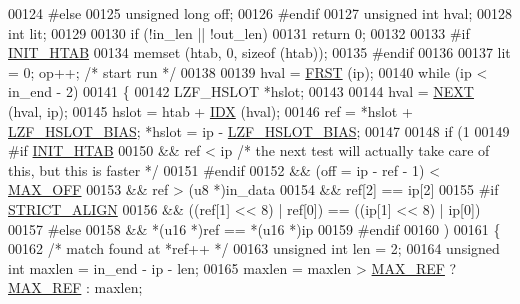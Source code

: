 \begin{DoxyCode}
00124 \textcolor{preprocessor}{#}\textcolor{preprocessor}{else}
00125   \textcolor{keywordtype}{unsigned} \textcolor{keywordtype}{long} off;
00126 \textcolor{preprocessor}{#}\textcolor{preprocessor}{endif}
00127   \textcolor{keywordtype}{unsigned} \textcolor{keywordtype}{int} hval;
00128   \textcolor{keywordtype}{int} lit;
00129 
00130   \textcolor{keywordflow}{if} (!in\_len || !out\_len)
00131     \textcolor{keywordflow}{return} 0;
00132 
00133 \textcolor{preprocessor}{#}\textcolor{preprocessor}{if} \hyperlink{lzfP_8h_a4c39dab09d3f4c2e0ab1e1d63799af37}{INIT\_HTAB}
00134   memset (htab, 0, \textcolor{keyword}{sizeof} (htab));
00135 \textcolor{preprocessor}{#}\textcolor{preprocessor}{endif}
00136 
00137   lit = 0; op++; \textcolor{comment}{/* start run */}
00138 
00139   hval = \hyperlink{lzf__c_8c_a61be8c5e877134668e5eb72181722432}{FRST} (ip);
00140   \textcolor{keywordflow}{while} (ip < in\_end - 2)
00141     \{
00142       LZF\_HSLOT *hslot;
00143 
00144       hval = \hyperlink{lzf__c_8c_a7690f0d6b9709b87bb8bf162b6bd32e2}{NEXT} (hval, ip);
00145       hslot = htab + \hyperlink{lzf__c_8c_afbc4dc0e5192c430576d8e81647d0ae8}{IDX} (hval);
00146       ref = *hslot + \hyperlink{lzfP_8h_a980629f2ad88980e35ca8519e53abac8}{LZF\_HSLOT\_BIAS}; *hslot = ip - 
      \hyperlink{lzfP_8h_a980629f2ad88980e35ca8519e53abac8}{LZF\_HSLOT\_BIAS};
00147 
00148       \textcolor{keywordflow}{if} (1
00149 \textcolor{preprocessor}{#}\textcolor{preprocessor}{if} \hyperlink{lzfP_8h_a4c39dab09d3f4c2e0ab1e1d63799af37}{INIT\_HTAB}
00150           && ref < ip \textcolor{comment}{/* the next test will actually take care of this, but this is faster */}
00151 \textcolor{preprocessor}{#}\textcolor{preprocessor}{endif}
00152           && (off = ip - ref - 1) < \hyperlink{lzf__c_8c_a836ed43c144629d6e1666999ed3b25f4}{MAX\_OFF}
00153           && ref > (u8 *)in\_data
00154           && ref[2] == ip[2]
00155 \textcolor{preprocessor}{#}\textcolor{preprocessor}{if} \hyperlink{lzfP_8h_a34203552492ece577af0130f4bc3afe5}{STRICT\_ALIGN}
00156           && ((ref[1] << 8) | ref[0]) == ((ip[1] << 8) | ip[0])
00157 \textcolor{preprocessor}{#}\textcolor{preprocessor}{else}
00158           && *(u16 *)ref == *(u16 *)ip
00159 \textcolor{preprocessor}{#}\textcolor{preprocessor}{endif}
00160         )
00161         \{
00162           \textcolor{comment}{/* match found at *ref++ */}
00163           \textcolor{keywordtype}{unsigned} \textcolor{keywordtype}{int} len = 2;
00164           \textcolor{keywordtype}{unsigned} \textcolor{keywordtype}{int} maxlen = in\_end - ip - len;
00165           maxlen = maxlen > \hyperlink{lzf__c_8c_a6f931885fb233742f38eff99d953475b}{MAX\_REF} ? \hyperlink{lzf__c_8c_a6f931885fb233742f38eff99d953475b}{MAX\_REF} : maxlen;

\end{DoxyCode}
